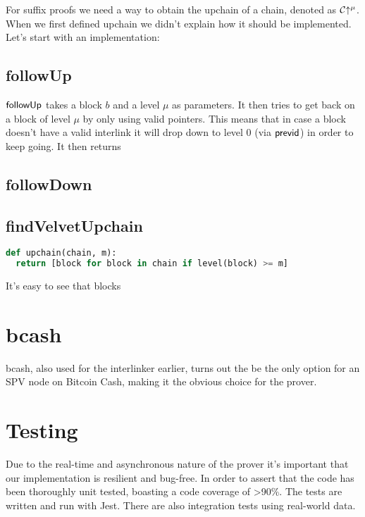 For suffix proofs we need a way to obtain the upchain of a chain, denoted as $\mathcal{C}\negthickspace\uparrow^\mu$. When we first defined upchain we didn't explain how it should be implemented. Let's start with an implementation:

\subsection{followUp}
$\sf followUp$ takes a block $b$ and a level $\mu$ as parameters. It then tries to get back on a block of level $\mu$ by only using valid pointers. This means that in case a block doesn't have a valid interlink it will drop down to level 0 (via $\sf previd$) in order to keep going. It then returns 

\subsection{followDown}

\subsection{findVelvetUpchain}

\begin{lstlisting}[language=Python]
def upchain(chain, m):
  return [block for block in chain if level(block) >= m]
\end{lstlisting}

It's easy to see that blocks 

\section{bcash}
bcash, also used for the interlinker earlier, turns out the be the only option for an SPV node on Bitcoin Cash, making it the obvious choice for the prover.

\section{Testing}
Due to the real-time and asynchronous nature of the prover it's important that our implementation is resilient and bug-free. In order to assert that the code has been thoroughly unit tested, boasting a code coverage of >90\%. The tests are written and run with Jest. There are also integration tests using real-world data.

